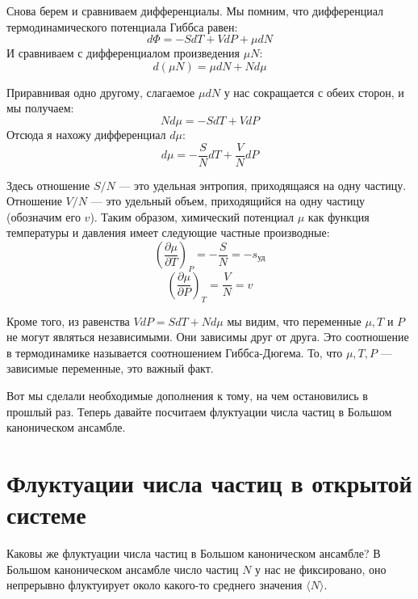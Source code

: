 \documentclass[../general/general]{subfiles}
\begin{document}
Снова берем и сравниваем дифференциалы. Мы помним, что дифференциал термодинамического потенциала Гиббса равен:
\begin{equation}
    d\Phi = -S dT + V dP + \mu dN
\end{equation}
И сравниваем с дифференциалом произведения $\mu N$:
\begin{equation}
    d(\mu N) = \mu dN + N d\mu
\end{equation}

Приравнивая одно другому, слагаемое $\mu dN$ у нас сокращается с обеих сторон, и мы получаем:
\begin{equation}
    N d\mu = -S dT + V dP
\end{equation}
Отсюда я нахожу дифференциал $d\mu$:
\begin{equation}
    d\mu = -\frac{S}{N} dT + \frac{V}{N} dP
\end{equation}

Здесь отношение $S/N$ — это удельная энтропия, приходящаяся на одну частицу. Отношение $V/N$ — это удельный объем, приходящийся на одну частицу (обозначим его $v$). Таким образом, химический потенциал $\mu$ как функция температуры и давления имеет следующие частные производные:
\begin{equation}
    \left( \frac{\partial \mu}{\partial T} \right)_{P} = -\frac{S}{N} = -s_\text{уд}
\end{equation}
\begin{equation}
    \left( \frac{\partial \mu}{\partial P} \right)_{T} = \frac{V}{N} = v
\end{equation}

Кроме того, из равенства $V dP = S dT + N d\mu$ мы видим, что переменные $\mu, T$ и $P$ не могут являться независимыми. Они зависимы друг от друга. Это соотношение в термодинамике называется соотношением Гиббса-Дюгема. То, что $\mu, T, P$ — зависимые переменные, это важный факт. 

Вот мы сделали необходимые дополнения к тому, на чем остановились в прошлый раз. Теперь давайте посчитаем флуктуации числа частиц в Большом каноническом ансамбле.



\section{Флуктуации числа частиц в открытой системе}

Каковы же флуктуации числа частиц в Большом каноническом ансамбле? В Большом каноническом ансамбле число частиц $N$ у нас не фиксировано, оно непрерывно флуктуирует около какого-то среднего значения $\langle N \rangle$. 
\end{document}
